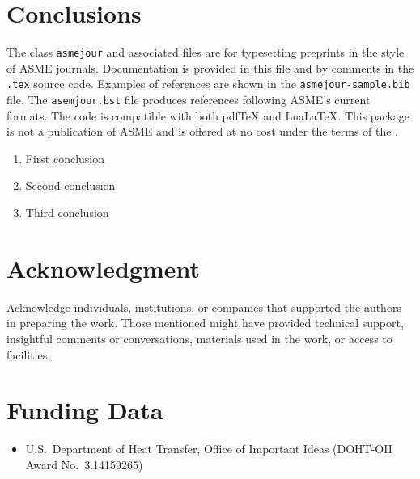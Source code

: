 \documentclass[balance,nocopyright,upint,varvw,hyphenate,barcolor=Goldenrod3,german]{asmejour}%
\newcommand*\pdfTeX{pdf\TeX}
\newcommand*\LuaLaTeX{Lua\LaTeX}
\begin{document}
\section{Conclusions}

The class \texttt{asmejour} and associated files are for typesetting preprints in the style of ASME journals.
Documentation is provided in this file and by comments in the \texttt{.tex} source code. Examples of references are shown in the \texttt{asmejour-sample.bib} file.  The \texttt{asemjour.bst} file produces references following ASME's current formats.  The code is compatible with both {\pdfTeX} and \LuaLaTeX. This package is not a publication of ASME and is offered at no cost under the terms of the .

\begin{enumerate}
\item First conclusion
\item Second conclusion
\item Third conclusion
\end{enumerate}


\section*{Acknowledgment} %

Acknowledge individuals, institutions, or companies that supported the authors in preparing the work. Those mentioned might have provided technical support, insightful comments or conversations, materials used in the work, or access to facilities.


\section*{Funding Data}

\begin{itemize}
\item U.S.\ Department of Heat Transfer, Office of Important Ideas (DOHT-OII Award No.\ 3.14159265)
\end{itemize}
\end{document}
